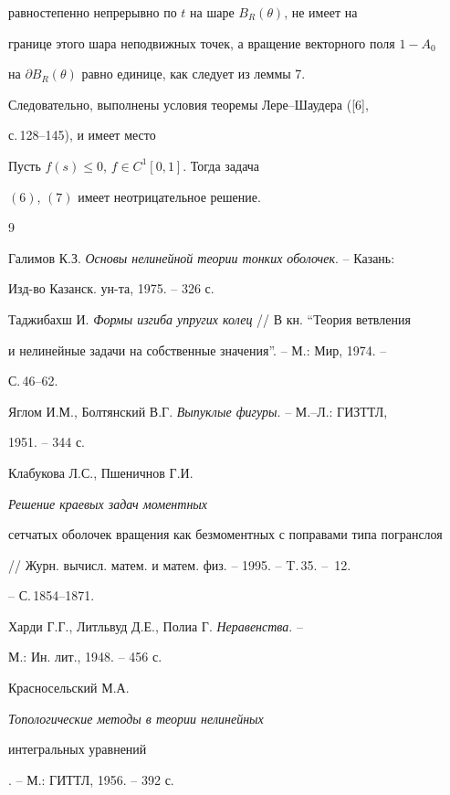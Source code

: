 равностепенно непрерывно по $t$ на шаре $B_R(\theta)$, не имеет на


границе этого шара неподвижных точек, а вращение векторного поля $1-A_0$


на $\partial B_R(\theta)$ равно единице, как следует из леммы 7.


Следовательно, выполнены условия теоремы Лере--Шаудера ([6],


с.\,128--145), и имеет место





\begin{thm}


Пусть $f(s) \le 0$, $f \in C^1[0,1]$. Тогда задача


$(6)$, $(7)$ имеет неотрицательное решение.


\end{thm}





\begin{thebibliography}{9}







Галимов К.З. {\em Основы нелинейной теории тонких оболочек}. -- Казань:


Изд-во Казанск. ун-та, 1975. -- 326 с.




Таджибахш И. {\em Формы изгиба упругих колец} // В кн. ``Теория ветвления


и нелинейные задачи на собственные значения''. -- М.: Мир, 1974. --


С.\,46--62.




Яглом И.М., Болтянский В.Г. {\em Выпуклые фигуры}. -- М.--Л.: ГИЗТТЛ,


1951. -- 344 с.




Клабукова Л.С., Пшеничнов Г.И. {\em Решение краевых задач моментных


сетчатых оболочек вращения как безмоментных с поправами типа погранслоя}


// Журн. вычисл. матем. и матем. физ. -- 1995. -- T.\,35. -- \No\,12.


-- С.\,1854--1871.




Харди Г.Г., Литльвуд Д.Е., Полиа Г. {\em Неравенства}. --


М.: Ин. лит., 1948. -- 456 с.




Красносельский М.А. {\em Топологические методы в теории нелинейных


интегральных уравнений}. -- М.: ГИТТЛ, 1956. -- 392 с.





\end{thebibliography}





